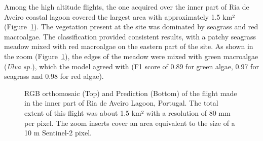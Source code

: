\documentclass[
  letterpaper,
  11pt,
  english,
  singlespacing,
  headsepline]{MastersDoctoralThesis}
\begin{document}
\begin{spacing}{1.5}
Among the high altitude flights, the one acquired over the inner part of
Ria de Aveiro coastal lagoon covered the largest area with approximately
1.5 km² (Figure~\ref{fig-Boat}). The vegetation present at the site was
dominated by seagrass and red macroalgae. The classification provided
consistent results, with a patchy seagrass meadow mixed with red
macroalgae on the eastern part of the site. As shown in the zoom
(Figure~\ref{fig-Boat}), the edges of the meadow were mixed with green
macroalgae (\emph{Ulva sp.}), which the model agreed with (F1 score of
0.89 for green algae, 0.97 for seagrass and 0.98 for red algae).

\begin{figure}


\caption{\label{fig-Boat}RGB orthomosaic (Top) and Prediction (Bottom)
of the flight made in the inner part of Ria de Aveiro Lagoon, Portugal.
The total extent of this flight was about 1.5 km² with a resolution of
80 mm per pixel. The zoom inserts cover an area equivalent to the size
of a 10 m Sentinel-2 pixel.}


\end{figure}
\end{spacing}
\end{document}
